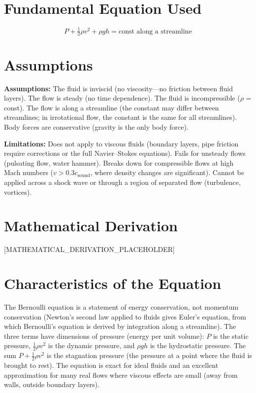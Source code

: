\documentclass[11pt,openright]{book}
\begin{document}
\section*{Fundamental Equation Used}

\begin{equation}
P + \tfrac{1}{2}\rho v^2 + \rho gh = \text{const along a streamline}
\end{equation}
\section*{Assumptions}

\textbf{Assumptions:} The fluid is inviscid (no viscosity---no friction between fluid layers). The flow is steady (no time dependence). The fluid is incompressible ($\rho$ = const). The flow is along a streamline (the constant may differ between streamlines; in irrotational flow, the constant is the same for all streamlines). Body forces are conservative (gravity is the only body force).


\textbf{Limitations:} Does not apply to viscous fluids (boundary layers, pipe friction require corrections or the full Navier--Stokes equations). Fails for unsteady flows (pulsating flow, water hammer). Breaks down for compressible flows at high Mach numbers ($v > 0.3c_{\text{sound}}$, where density changes are significant). Cannot be applied across a shock wave or through a region of separated flow (turbulence, vortices).


\section*{Mathematical Derivation}

[MATHEMATICAL_DERIVATION_PLACEHOLDER]

\section*{Characteristics of the Equation}

The Bernoulli equation is a statement of energy conservation, not momentum conservation (Newton's second law applied to fluids gives Euler's equation, from which Bernoulli's equation is derived by integration along a streamline). The three terms have dimensions of pressure (energy per unit volume): $P$ is the static pressure, $\frac{1}{2}\rho v^2$ is the dynamic pressure, and $\rho gh$ is the hydrostatic pressure. The sum $P + \frac{1}{2}\rho v^2$ is the stagnation pressure (the pressure at a point where the fluid is brought to rest). The equation is exact for ideal fluids and an excellent approximation for many real flows where viscous effects are small (away from walls, outside boundary layers).
\end{document}
